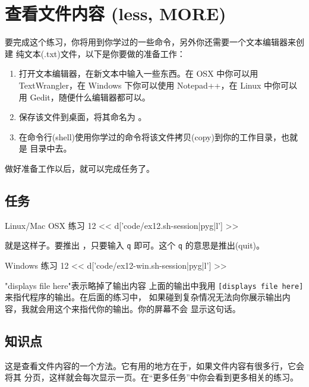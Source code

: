\chapter{查看文件内容 (less, MORE)}

要完成这个练习，你将用到你学过的一些命令，另外你还需要一个文本编辑器来创建
纯文本(.txt)文件，以下是你要做的准备工作：

\begin{enumerate}
\item 打开文本编辑器，在新文本中输入一些东西。在 OSX 中你可以用
    TextWrangler，在 Windows 下你可以使用 Notepad++，在 Linux 中你可以用 
    Gedit，随便什么编辑器都可以。
\item 保存该文件到桌面，将其命名为 。
\item 在命令行(shell)使用你学过的命令将该文件拷贝(copy)到你的工作目录，也就是
     目录中去。
\end{enumerate}

做好准备工作以后，就可以完成任务了。

\section{任务}

\begin{code}{Linux/Mac OSX 练习 12}
<< d['code/ex12.sh-session|pyg|l'] >>
\end{code}

就是这样子。要推出 ，只要输入 \verb|q| 即可。这个 \verb|q| 
的意思是推出(quit)。

\begin{code}{Windows 练习 12}
<< d['code/ex12-win.sh-session|pyg|l'] >>
\end{code}

\begin{aside}{"displays file here"表示略掉了输出内容}
上面的输出中我用 \verb|[displays file here]| 来指代程序的输出。在后面的练习中，
如果碰到复杂情况无法向你展示输出内容，我就会用这个来指代你的输出。你的屏幕不会
显示这句话。
\end{aside}

\section{知识点}

这是查看文件内容的一个方法。它有用的地方在于，如果文件内容有很多行，它会将其
分页，这样就会每次显示一页。在“更多任务”中你会看到更多相关的练习。

